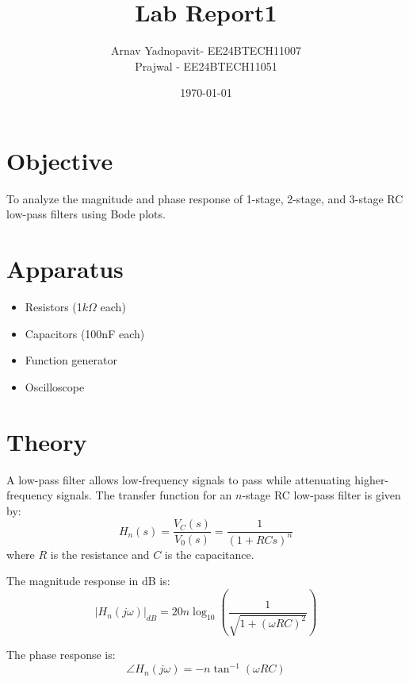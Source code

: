 \documentclass[a4paper,12pt]{article}
\title{Lab Report1}
\author{Arnav Yadnopavit- EE24BTECH11007\\Prajwal - EE24BTECH11051}
\date{\today}
\begin{document}
\maketitle
\section*{Objective}
To analyze the magnitude and phase response of 1-stage, 2-stage, and 3-stage RC low-pass filters using Bode plots.

\section*{Apparatus}
\begin{itemize}
    \item Resistors (1$k\Omega$ each)
    \item Capacitors (100nF each)
    \item Function generator
    \item Oscilloscope
\end{itemize}

\section*{Theory}
A low-pass filter allows low-frequency signals to pass while attenuating higher-frequency signals. The transfer function for an $n$-stage RC low-pass filter is given by:
\begin{equation}
H_n(s) =\frac{V_C(s)}{V_0(s)}= \frac{1}{(1 + RCs)^n}
\end{equation}
where $R$ is the resistance and $C$ is the capacitance.

The magnitude response in dB is:
\begin{equation}
|H_n(j\omega)|_{dB} = 20n \log_{10}\left(\frac{1}{\sqrt{1+(\omega RC)^2}}\right)
\end{equation}

The phase response is:
\begin{equation}
\angle H_n(j\omega) = -n \tan^{-1}(\omega RC)
\end{equation}
\begin{figure}[H]
    \centering
    \begin{subfigure}{0.5\textwidth}
        
    \end{subfigure}%
    \begin{subfigure}{0.5\textwidth}
        \centering
        
    \end{subfigure}
    \begin{subfigure}{0.5\textwidth}
        \centering
        
    \end{subfigure}
\end{figure}
\end{document}

